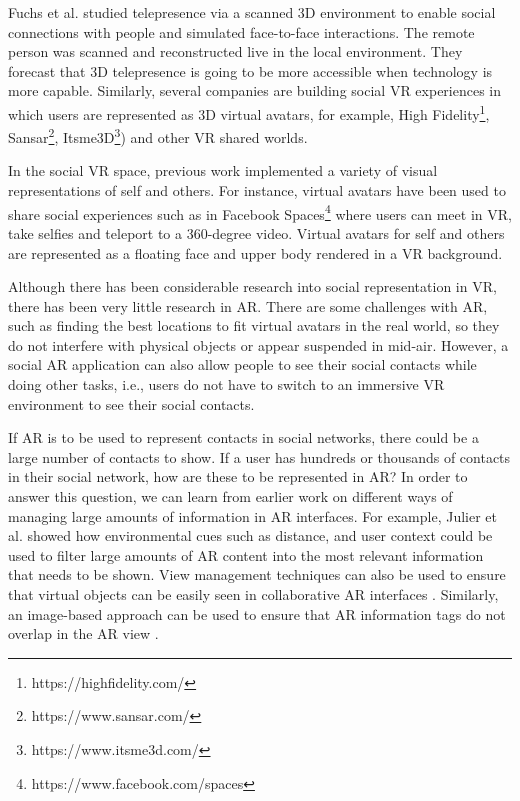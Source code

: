 Fuchs et al. \cite{Fuchs2014} studied telepresence via a scanned 3D environment to enable social connections with people and simulated face-to-face interactions. The remote person was scanned and reconstructed live in the local environment. They forecast that 3D telepresence is going to be more accessible when technology is more capable. Similarly, several companies are building social VR experiences in which users are represented as 3D virtual avatars, for example, High Fidelity\footnote{https://highfidelity.com/}, Sansar\footnote{https://www.sansar.com/}, Itsme3D\footnote{https://www.itsme3d.com/}) and other VR shared worlds. 

In the social VR space, previous work implemented a variety of visual representations of self and others. For instance, virtual avatars have been used to share social experiences such as in Facebook Spaces\footnote{https://www.facebook.com/spaces} where users can meet in VR, take selfies and teleport to a 360-degree video. Virtual avatars for self and others are represented as a floating face and upper body rendered in a VR background. 

Although there has been considerable research into social representation in VR, there has been very little research in AR. There are some challenges with AR, such as finding the best locations to fit virtual avatars in the real world, so they do not interfere with physical objects or appear suspended in mid-air. However, a social AR application can also allow people to see their social contacts while doing other tasks, i.e., users do not have to switch to an immersive VR environment to see their social contacts.

If AR is to be used to represent contacts in social networks, there could be a large number of contacts to show. If a user has hundreds or thousands of contacts in their social network, how are these to be represented in AR? In order to answer this question, we can learn from earlier work on different ways of managing large amounts of information in AR interfaces. For example, Julier et al. showed how environmental cues such as distance, and user context could be used to filter large amounts of AR content into the most relevant information that needs to be shown\cite{Julier2002}. View management techniques can also be used to ensure that virtual objects can be easily seen in collaborative AR interfaces \cite{Hollerer2001}. Similarly, an image-based approach can be used to ensure that AR information tags do not overlap in the AR view \cite{Grasset2012}. 

